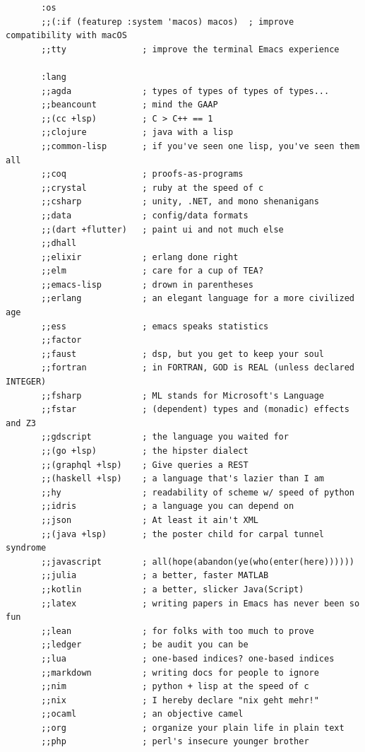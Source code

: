 \documentclass[11pt]{article}
\begin{document}
\begin{verbatim}
       :os
       ;;(:if (featurep :system 'macos) macos)  ; improve compatibility with macOS
       ;;tty               ; improve the terminal Emacs experience

       :lang
       ;;agda              ; types of types of types of types...
       ;;beancount         ; mind the GAAP
       ;;(cc +lsp)         ; C > C++ == 1
       ;;clojure           ; java with a lisp
       ;;common-lisp       ; if you've seen one lisp, you've seen them all
       ;;coq               ; proofs-as-programs
       ;;crystal           ; ruby at the speed of c
       ;;csharp            ; unity, .NET, and mono shenanigans
       ;;data              ; config/data formats
       ;;(dart +flutter)   ; paint ui and not much else
       ;;dhall
       ;;elixir            ; erlang done right
       ;;elm               ; care for a cup of TEA?
       ;;emacs-lisp        ; drown in parentheses
       ;;erlang            ; an elegant language for a more civilized age
       ;;ess               ; emacs speaks statistics
       ;;factor
       ;;faust             ; dsp, but you get to keep your soul
       ;;fortran           ; in FORTRAN, GOD is REAL (unless declared INTEGER)
       ;;fsharp            ; ML stands for Microsoft's Language
       ;;fstar             ; (dependent) types and (monadic) effects and Z3
       ;;gdscript          ; the language you waited for
       ;;(go +lsp)         ; the hipster dialect
       ;;(graphql +lsp)    ; Give queries a REST
       ;;(haskell +lsp)    ; a language that's lazier than I am
       ;;hy                ; readability of scheme w/ speed of python
       ;;idris             ; a language you can depend on
       ;;json              ; At least it ain't XML
       ;;(java +lsp)       ; the poster child for carpal tunnel syndrome
       ;;javascript        ; all(hope(abandon(ye(who(enter(here))))))
       ;;julia             ; a better, faster MATLAB
       ;;kotlin            ; a better, slicker Java(Script)
       ;;latex             ; writing papers in Emacs has never been so fun
       ;;lean              ; for folks with too much to prove
       ;;ledger            ; be audit you can be
       ;;lua               ; one-based indices? one-based indices
       ;;markdown          ; writing docs for people to ignore
       ;;nim               ; python + lisp at the speed of c
       ;;nix               ; I hereby declare "nix geht mehr!"
       ;;ocaml             ; an objective camel
       ;;org               ; organize your plain life in plain text
       ;;php               ; perl's insecure younger brother

\end{verbatim}
\end{document}
